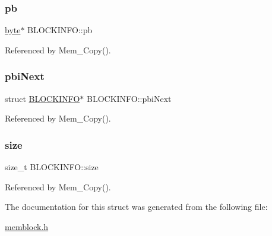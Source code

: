 \subsubsection{\texorpdfstring{pb}{pb}}
{\footnotesize\ttfamily \hyperlink{generic_8h_a0c8186d9b9b7880309c27230bbb5e69d}{byte}$\ast$ B\+L\+O\+C\+K\+I\+N\+F\+O\+::pb}



Referenced by Mem\+\_\+\+Copy().

\mbox{\label{struct_b_l_o_c_k_i_n_f_o_a3a3031c99ba0cc062336f8cd80fcfdb6}} 
\subsubsection{\texorpdfstring{pbi\+Next}{pbiNext}}
{\footnotesize\ttfamily struct \hyperlink{struct_b_l_o_c_k_i_n_f_o}{B\+L\+O\+C\+K\+I\+N\+FO}$\ast$ B\+L\+O\+C\+K\+I\+N\+F\+O\+::pbi\+Next}



Referenced by Mem\+\_\+\+Copy().

\mbox{\label{struct_b_l_o_c_k_i_n_f_o_a418663a53c4fa4a7611c50b0f4ccdffa}} 
\subsubsection{\texorpdfstring{size}{size}}
{\footnotesize\ttfamily size\+\_\+t B\+L\+O\+C\+K\+I\+N\+F\+O\+::size}



Referenced by Mem\+\_\+\+Copy().



The documentation for this struct was generated from the following file\+:\begin{DoxyCompactItemize}
\item 
\hyperlink{memblock_8h}{memblock.\+h}\end{DoxyCompactItemize}
